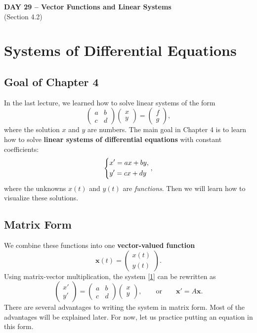 \documentclass[11pt,letterpaper]{article}
\begin{document}
\begin{center}
\Large\textbf{DAY 29 -- Vector Functions and Linear Systems}\\
\normalsize (Section 4.2)
\end{center}

\section{Systems of Differential Equations}

\subsection{Goal of Chapter 4}
In the last lecture, we learned how to solve linear systems of the form
$$
\begin{pmatrix}
    a & b\\
    c & d
\end{pmatrix} \begin{pmatrix}
    x\\y 
\end{pmatrix} = \begin{pmatrix}
    f\\g
\end{pmatrix},
$$
where the solution $x$ and $y$ are numbers. The main goal in Chapter 4 is to learn how to solve \textbf{linear systems of differential equations} with constant coefficients:
\begin{equation}    
\begin{dcases}
x'=ax+by,\\
y'=cx+dy
\end{dcases},\label{1}
\end{equation}
where the unknowns $x(t)$ and $y(t)$ are \textit{functions}. Then we will learn how to visualize these solutions.

\subsection{Matrix Form}
We combine these functions into one \textbf{vector-valued function}
\[
\mathbf{x}(t)=
\begin{pmatrix}x(t)\\y(t)\end{pmatrix}.
\]
Using matrix-vector multiplication, the system \eqref{1} can be rewritten as 
\[
\begin{pmatrix}x'\\y'\end{pmatrix}
=
\begin{pmatrix}
a&b\\c&d
\end{pmatrix}
\begin{pmatrix}x\\y\end{pmatrix}, \qquad \text{or} \qquad \mathbf{x}'=A\mathbf{x}.
\]
There are several advantages to writing the system in matrix form. Most of the advantages will be explained later. For now, let us practice putting an equation in this form.
\end{document}
